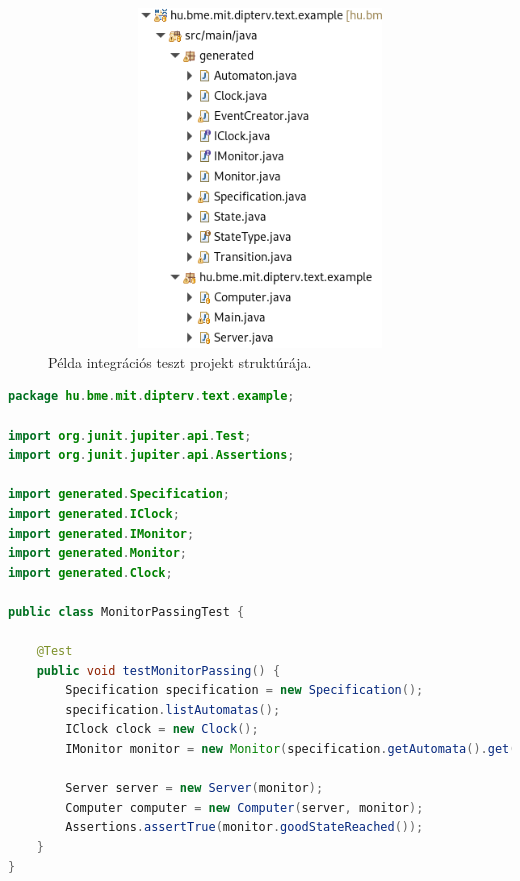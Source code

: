 \begin{figure}[!ht]
    \centering
    \includegraphics[width=150mm, height=9cm, keepaspectratio]{figures/integration_test_structure.png}
    \caption{Példa integrációs teszt projekt struktúrája.}
\end{figure}

\begin{lstlisting}[language=java, frame=single, float=ht!, caption={Integrációs teszteset.},captionpos=b]
package hu.bme.mit.dipterv.text.example;

import org.junit.jupiter.api.Test;
import org.junit.jupiter.api.Assertions;

import generated.Specification;
import generated.IClock;
import generated.IMonitor;
import generated.Monitor;
import generated.Clock;

public class MonitorPassingTest {

	@Test
	public void testMonitorPassing() {
		Specification specification = new Specification();
		specification.listAutomatas();
		IClock clock = new Clock();
		IMonitor monitor = new Monitor(specification.getAutomata().get(0), clock);

		Server server = new Server(monitor);
		Computer computer = new Computer(server, monitor);
		Assertions.assertTrue(monitor.goodStateReached());
	}
}
\end{lstlisting}

